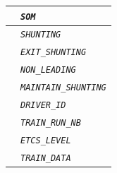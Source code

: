 \documentclass{template/openetcs}
\begin{document}
\begin{itemize}
\begin{longtable}{|l|l|}
				\hline
					
				&	\begin{minipage}[t]{0.78\linewidth} \emph{\texttt{SOM}} \end{minipage} \\
				
				\hline
				
				&	\begin{minipage}[t]{0.78\linewidth} \emph{\texttt{SHUNTING}} \end{minipage} \\
				
				\hline
				
				&	\begin{minipage}[t]{0.78\linewidth} \emph{\texttt{EXIT\_SHUNTING}} \end{minipage} \\
				
				\hline
				
				&	\begin{minipage}[t]{0.78\linewidth} \emph{\texttt{NON\_LEADING}} \end{minipage} \\
				
				\hline
				
				&	\begin{minipage}[t]{0.78\linewidth} \emph{\texttt{MAINTAIN\_SHUNTING}} \end{minipage} \\
				
				\hline
				
				&	\begin{minipage}[t]{0.78\linewidth} \emph{\texttt{DRIVER\_ID}} \end{minipage} \\
				
				\hline
				
				&	\begin{minipage}[t]{0.78\linewidth} \emph{\texttt{TRAIN\_RUN\_NB}} \end{minipage} \\
				
				\hline
				
				&	\begin{minipage}[t]{0.78\linewidth} \emph{\texttt{ETCS\_LEVEL}} \end{minipage} \\
				
				\hline
				
				&	\begin{minipage}[t]{0.78\linewidth} \emph{\texttt{TRAIN\_DATA}} \end{minipage} \\
				

\end{longtable}
\end{itemize}
\end{document}

